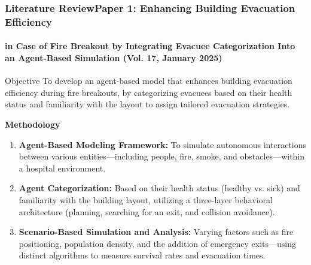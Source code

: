 \documentclass{beamer}
\begin{document}
\begin{frame}
\frametitle{Literature Review\newline Paper 1: Enhancing Building Evacuation Efficiency}
\framesubtitle{in Case of Fire Breakout by Integrating Evacuee Categorization Into an Agent-Based Simulation (Vol. 17, January 2025)}
\scriptsize

\begin{block}{Objective}
To develop an agent-based model that enhances building evacuation efficiency during fire breakouts, by categorizing evacuees based on their health status and familiarity with the layout to assign tailored evacuation strategies.
\end{block}



\textbf{Methodology}
\begin{enumerate}
    \item \textbf{Agent-Based Modeling Framework:} To simulate autonomous interactions between various entities—including people, fire, smoke, and obstacles—within a hospital environment.
    \item \textbf{Agent Categorization:} Based on their health status (healthy vs. sick) and familiarity with the building layout, utilizing a three-layer behavioral architecture (planning, searching for an exit, and collision avoidance).
    \item \textbf{Scenario-Based Simulation and Analysis:} Varying factors such as fire positioning, population density, and the addition of emergency exits—using distinct algorithms to measure survival rates and evacuation times.
\end{enumerate}
\end{frame}
\end{document}
